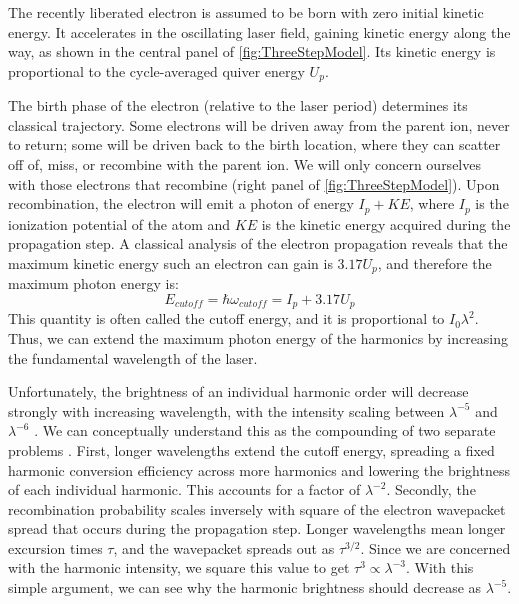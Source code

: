 The recently liberated electron is assumed to be born with zero initial kinetic energy. It accelerates in the oscillating laser field, gaining kinetic energy along the way, as shown in the central panel of \cref{fig:ThreeStepModel}. Its kinetic energy is proportional to the cycle-averaged quiver energy $U_p$.

The birth phase of the electron (relative to the laser period) determines its classical trajectory. Some electrons will be driven away from the parent ion, never to return; some will be driven back to the birth location, where they can scatter off of, miss, or recombine with the parent ion. We will only concern ourselves with those electrons that recombine (right panel of \cref{fig:ThreeStepModel}). Upon recombination, the electron will emit a photon of energy $I_p + KE$, where $I_p$ is the ionization potential of the atom and $KE$ is the kinetic energy acquired during the propagation step. A classical analysis of the electron propagation reveals that the maximum kinetic energy such an electron can gain is $3.17 U_p$, and therefore the maximum photon energy is: 
\begin{equation}
E_{cutoff} = \hbar \omega_{cutoff} = I_p + 3.17 U_p
\label{eqn:cutoff_energy}
\end{equation}
This quantity is often called the cutoff energy, and it is proportional to $I_0 \lambda^2$. Thus, we can extend the maximum photon energy of the harmonics by increasing the fundamental wavelength of the laser.

Unfortunately, the brightness of an individual harmonic order will decrease strongly with increasing wavelength, with the intensity scaling between $\lambda^{-5}$ and $\lambda^{-6}$ \cite{tateScalingWavePacketDynamics2007,shinerWavelengthScalingHigh2009}. We can conceptually understand this as the compounding of two separate problems \cite{lewensteinTheoryHighharmonicGeneration1994}. First, longer wavelengths extend the cutoff energy, spreading a fixed harmonic conversion efficiency across more harmonics and lowering the brightness of each individual harmonic. This accounts for a factor of $\lambda^{-2}$. Secondly, the recombination probability scales inversely with square of the electron wavepacket spread that occurs during the propagation step. Longer wavelengths mean longer excursion times $\tau$, and the wavepacket spreads out as $\tau^{3/2}$. Since we are concerned with the harmonic intensity, we square this value to get $\tau^3 \propto \lambda^{-3}$. With this simple argument, we can see why the harmonic brightness should decrease as $\lambda^{-5}$.

